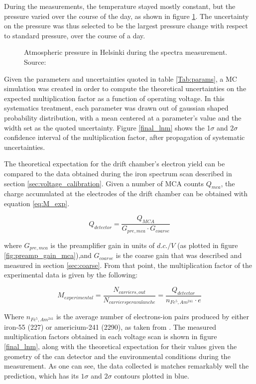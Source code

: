 During the measurements, the temperature stayed mostly constant, but the pressure varied over the course of the day, as shown in figure \ref{fig:pressure}. The uncertainty on the pressure was thus selected to be the largest pressure change with respect to standard pressure, over the course of a day.

\begin{figure}[htb]
  \caption{Atmospheric pressure in Helsinki during the spectra measurement. Source: \cite{meteo}}
  \label{fig:pressure}
\end{figure}

Given the parameters and uncertainties quoted in table \ref{Tab:params}, a MC simulation was created in order to compute the theoretical uncertainties on the expected multiplication factor as a function of operating voltage. In this systematics treatment, each parameter was drawn out of gaussian shaped probability distribution, with a mean centered at a parameter's value and the width set as the quoted uncertainty. Figure \ref{final_lnm} shows the 1$\sigma$ and 2$\sigma$ confidence interval of the multiplication factor, after propagation of systematic uncertainties.

The theoretical expectation for the drift chamber's electron yield can be compared to the data obtained during the iron spectrum scan described in section \ref{sec:voltage_calibration}. Given a number of MCA counts $Q_{mca}$, the charge accumulated at the electrodes of the drift chamber can be obtained with equation \ref{eq:M_exp}.

\begin{equation}
  \label{eq:M_exp}
  Q_{detector} = \frac{Q_{MCA}}{G_{pre,mca}\cdot{G_{coarse}}}
\end{equation}

where $G_{pre,mca}$ is the preamplifier gain in units of $d.c./V$ (as plotted in figure \ref{fig:preamp_gain_mca}),and $G_{coarse}$ is the coarse gain that was described and measured in section \ref{sec:coarse}. From that point, the multiplication factor of the experimental data is given by the following:

\begin{equation}
  M_{experimental} = \frac{N_{carriers,out}}{N_{carriers per avalanche}} = \frac{Q_{detector}}{n_{Fe^{5},Am^{241}}\cdot e}
\end{equation}

Where $n_{Fe^{5},Am^{241}}$ is the average number of electrons-ion pairs produced by either iron-55 (227) or americium-241 (2290), as taken from \cite{can_paper}. The measured multiplication factors obtained in each voltage scan is shown in figure \ref{final_lnm}, along with the theoretical expectation for their values given the geometry of the can detector and the environmental conditions during the measurement. As one can see, the data collected is matches remarkably well the prediction, which has its $1\sigma$ and $2\sigma$ contours plotted in blue.

